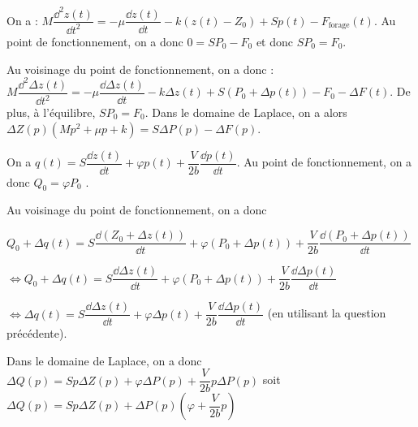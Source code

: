 \ifprof
\begin{corrige}
On a : 
$M\dfrac{\dd^2 z(t)}{\dd t^2} = -\mu \dfrac{\dd z (t)}{\dd t} - k\left( z(t) - Z_0\right) +Sp(t)-F_{\text{forage}}(t)$. 
Au point de fonctionnement, on a donc $0 = SP_0-F_0$ et donc $SP_0 = F_0$.
\end{corrige}
\else
\fi



\ifprof
\begin{corrige}
Au voisinage du point de fonctionnement, on a donc : $M\dfrac{\dd^2 \Delta z(t)}{\dd t^2} = -\mu \dfrac{\dd \Delta z (t)}{\dd t} - k\Delta z(t) +S\left( P_0 +\Delta p(t ) \right)-F_0 - \Delta F(t )$. De plus, à l'équilibre, $SP_0=F_0$. 
Dans le domaine de Laplace, on a alors $ \Delta Z(p)  \left( Mp^2 + \mu p +k\right) = S\Delta P(p) - \Delta F(p )$.
\end{corrige}
\else
\fi


\ifprof
\begin{corrige}
On a $q(t)=S \dfrac{\dd z (t)}{\dd t} +\varphi p(t) + \dfrac{V}{2b}  \dfrac{\dd p(t)}{\dd t} $.
Au point de fonctionnement, on a donc $Q_0 = \varphi P_0$ .
\end{corrige}
\else
\fi




\ifprof
\begin{corrige}
Au voisinage du point de fonctionnement, on a donc  


$ Q_0 +\Delta q(t )=S \dfrac{\dd \left(Z_0 +\Delta z (t )\right)}{\dd t} +\varphi \left( P_0 +\Delta p(t ) \right) + \dfrac{V}{2b}  \dfrac{\dd \left(P_0 +\Delta p(t )\right)}{\dd t}$

$ \Leftrightarrow Q_0 +\Delta q(t )=S \dfrac{\dd \Delta z (t )}{\dd t} +\varphi \left( P_0 +\Delta p(t ) \right) + \dfrac{V}{2b}  \dfrac{\dd \Delta p(t )}{\dd t}$

$ \Leftrightarrow \Delta q(t )=S \dfrac{\dd \Delta z (t )}{\dd t} +\varphi  \Delta p(t ) + \dfrac{V}{2b}  \dfrac{\dd \Delta p(t )}{\dd t}$ (en utilisant la question précédente).

Dans le domaine de Laplace, on a donc $  \Delta Q(p)=S p\Delta Z(p ) +\varphi  \Delta P(p) + \dfrac{V}{2b}  p \Delta P(p)$ soit 
$  \Delta Q(p)=S p\Delta Z(p ) + \Delta P(p)\left(\varphi  + \dfrac{V}{2b}  p\right)$


\end{corrige}
\else
\fi

